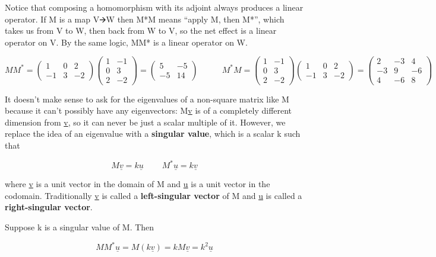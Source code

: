 \documentclass[oneside,english]{amsbook}
\numberwithin{section}{chapter}
\theoremstyle{plain}
\theoremstyle{definition}
\begin{document}
Notice that composing a homomorphism with its adjoint always produces a
linear operator. If M is a map V🡪W then M*M means ``apply M, then M*'',
which takes us from V to W, then back from W to V, so the net effect is
a linear operator on V. By the same logic, MM* is a linear operator on
W.

\[MM^{*} = \begin{pmatrix}
	1 & 0 & 2 \\
	- 1 & 3 & - 2
\end{pmatrix}\begin{pmatrix}
	1 & - 1 \\
	0 & 3 \\
	2 & - 2
\end{pmatrix} = \begin{pmatrix}
	5 & - 5 \\
	- 5 & 14
\end{pmatrix}\ \ \ \ \ \ \ \ \ \ \ \ \ M^{*}M = \begin{pmatrix}
	1 & - 1 \\
	0 & 3 \\
	2 & - 2
\end{pmatrix}\begin{pmatrix}
	1 & 0 & 2 \\
	- 1 & 3 & - 2
\end{pmatrix} = \begin{pmatrix}
	2 & - 3 & 4 \\
	- 3 & 9 & - 6 \\
	4 & - 6 & 8
\end{pmatrix}\]

It doesn't make sense to ask for the eigenvalues of a non-square matrix
like M because it can't possibly have any eigenvectors: M\ul{v} is of a
completely different dimension from \ul{v}, so it can never be just a
scalar multiple of it. However, we replace the idea of an eigenvalue
with a \textbf{singular value}, which is a scalar k such that

\[M\underline{v} = k\underline{u}\ \ \ \ \ \ \ \ \ \ M^{*}\underline{u} = k\underline{v}\]

where \ul{v} is a unit vector in the domain of M and \ul{u} is a unit
vector in the codomain. Traditionally \ul{v} is called a
\textbf{left-singular vector} of M and \ul{u} is called a
\textbf{right-singular vector}.

Suppose k is a singular value of M. Then

\[{MM^{*}\underline{u} = M\left( k\underline{v} \right)
}{= kM\underline{v}
}{= k^{2}\underline{u}}\]
\end{document}

